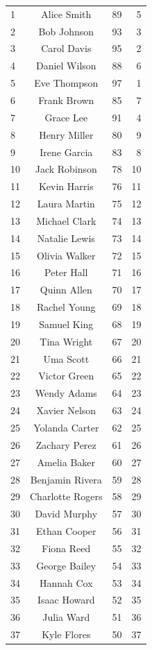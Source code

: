 \documentclass[12pt,a4paper,oneside]{book}
\begin{document}
\begin{longtable}{@{\extracolsep{\fill}} l c r r}
1 & Alice Smith & 89 & 5 \\
2 & Bob Johnson & 93 & 3 \\
3 & Carol Davis & 95 & 2 \\
4 & Daniel Wilson & 88 & 6 \\
5 & Eve Thompson & 97 & 1 \\
6 & Frank Brown & 85 & 7 \\
7 & Grace Lee & 91 & 4 \\
8 & Henry Miller & 80 & 9 \\
9 & Irene Garcia & 83 & 8 \\
10 & Jack Robinson & 78 & 10 \\
11 & Kevin Harris & 76 & 11 \\
12 & Laura Martin & 75 & 12 \\
13 & Michael Clark & 74 & 13 \\
14 & Natalie Lewis & 73 & 14 \\
15 & Olivia Walker & 72 & 15 \\
16 & Peter Hall & 71 & 16 \\
17 & Quinn Allen & 70 & 17 \\
18 & Rachel Young & 69 & 18 \\
19 & Samuel King & 68 & 19 \\
20 & Tina Wright & 67 & 20 \\
21 & Uma Scott & 66 & 21 \\
22 & Victor Green & 65 & 22 \\
23 & Wendy Adams & 64 & 23 \\
24 & Xavier Nelson & 63 & 24 \\
25 & Yolanda Carter & 62 & 25 \\
26 & Zachary Perez & 61 & 26 \\
27 & Amelia Baker & 60 & 27 \\
28 & Benjamin Rivera & 59 & 28 \\
29 & Charlotte Rogers & 58 & 29 \\
30 & David Murphy & 57 & 30 \\
31 & Ethan Cooper & 56 & 31 \\
32 & Fiona Reed & 55 & 32 \\
33 & George Bailey & 54 & 33 \\
34 & Hannah Cox & 53 & 34 \\
35 & Isaac Howard & 52 & 35 \\
36 & Julia Ward & 51 & 36 \\
37 & Kyle Flores & 50 & 37 \\

\end{longtable}
\end{document}
